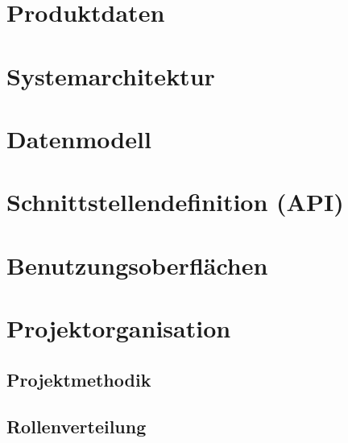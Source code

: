 \documentclass[%
	ngerman,
	12pt,
	a4paper
]{scrbook}
\begin{document}
\chapter{Produktdaten}
\chapter{Systemarchitektur}
\chapter{Datenmodell}
\chapter{Schnittstellendefinition (API)}
\chapter{Benutzungsoberflächen}

\chapter{Projektorganisation}
\section{Projektmethodik}
\section{Rollenverteilung}
\end{document}
